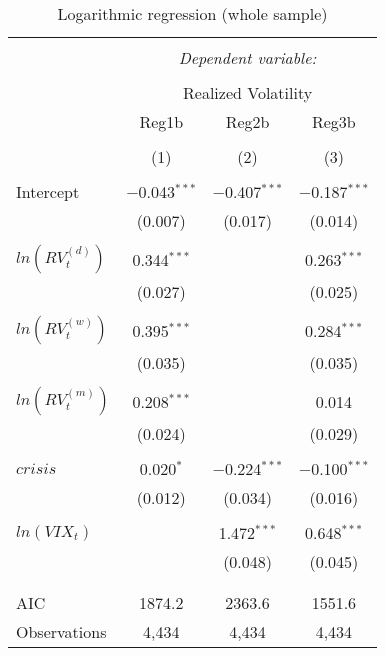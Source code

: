 
\begin{table}[!htbp] \centering 
\begin{threeparttable}
  \caption{Logarithmic regression (whole sample)} 
  \label{tab:newey2} 
\begin{tabular}{@{\extracolsep{5pt}}lccc} 
\\[-1.8ex]\hline 
\hline \\[-1.8ex] 
 & \multicolumn{3}{c}{\textit{Dependent variable:}} \\ 
\cline{2-4} 
\\[-1.8ex] & \multicolumn{3}{c}{Realized Volatility} \\ 
 & Reg1b & Reg2b & Reg3b \\ 
\\[-1.8ex] & (1) & (2) & (3)\\ 
\hline \\[-1.8ex] 
 Intercept & $-$0.043$^{***}$ & $-$0.407$^{***}$ & $-$0.187$^{***}$ \\ 
  & (0.007) & (0.017) & (0.014) \\ 
  & & & \\ 
 $ln(RV^{(d)}_{t})$ & 0.344$^{***}$ &  & 0.263$^{***}$ \\ 
  & (0.027) &  & (0.025) \\ 
  & & & \\ 
 $ln(RV^{(w)}_{t})$ & 0.395$^{***}$ &  & 0.284$^{***}$ \\ 
  & (0.035) &  & (0.035) \\ 
  & & & \\ 
 $ ln(RV^{(m)}_{t})$ & 0.208$^{***}$ &  & 0.014 \\ 
  & (0.024) &  & (0.029) \\ 
  & & & \\ 
 $crisis$ & 0.020$^{*}$ & $-$0.224$^{***}$ & $-$0.100$^{***}$ \\ 
  & (0.012) & (0.034) & (0.016) \\ 
  & & & \\ 
 $ln(VIX_{t})$ &  & 1.472$^{***}$ & 0.648$^{***}$ \\ 
  &  & (0.048) & (0.045) \\ 
  & & & \\ 
\hline \\[-1.8ex] 
AIC & 1874.2 & 2363.6 & 1551.6 \\ 
Observations & 4,434 & 4,434 & 4,434 \\ 

\end{tabular}
\end{threeparttable}
\end{table}
